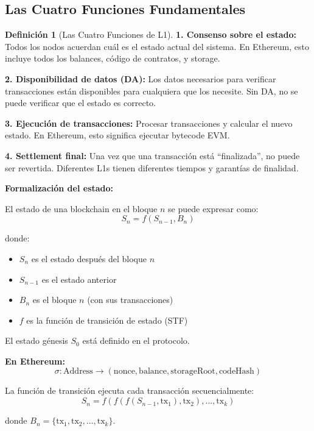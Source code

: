 \documentclass[11pt,a4paper,twoside,openright]{book}
\theoremstyle{definition}
\newtheorem{definition}{Definición}[chapter]
\theoremstyle{plain}
\theoremstyle{remark}
\begin{document}
\subsection{Las Cuatro Funciones Fundamentales}

\begin{definition}[Las Cuatro Funciones de L1]
\textbf{1. Consenso sobre el estado:}
Todos los nodos acuerdan cuál es el estado actual del sistema. En Ethereum, esto incluye todos los balances, código de contratos, y storage.

\textbf{2. Disponibilidad de datos (DA):}
Los datos necesarios para verificar transacciones están disponibles para cualquiera que los necesite. Sin DA, no se puede verificar que el estado es correcto.

\textbf{3. Ejecución de transacciones:}
Procesar transacciones y calcular el nuevo estado. En Ethereum, esto significa ejecutar bytecode EVM.

\textbf{4. Settlement final:}
Una vez que una transacción está ``finalizada'', no puede ser revertida. Diferentes L1s tienen diferentes tiempos y garantías de finalidad.
\end{definition}

\begin{mathnote}
\textbf{Formalización del estado:}

El estado de una blockchain en el bloque $n$ se puede expresar como:
\[ S_n = f(S_{n-1}, B_n) \]

donde:
\begin{itemize}
    \item $S_n$ es el estado después del bloque $n$
    \item $S_{n-1}$ es el estado anterior
    \item $B_n$ es el bloque $n$ (con sus transacciones)
    \item $f$ es la función de transición de estado (STF)
\end{itemize}

El estado génesis $S_0$ está definido en el protocolo.

\textbf{En Ethereum:}
\[ \sigma: \text{Address} \to (\text{nonce}, \text{balance}, \text{storageRoot}, \text{codeHash}) \]

La función de transición ejecuta cada transacción secuencialmente:
\[ S_n = f(f(f(S_{n-1}, \text{tx}_1), \text{tx}_2), \ldots, \text{tx}_k) \]

donde $B_n = \{\text{tx}_1, \text{tx}_2, \ldots, \text{tx}_k\}$.
\end{mathnote}
\end{document}
